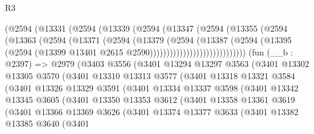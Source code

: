 \begin{lexlean}{R3}
\begin{coremodule}
                      (@2594
                        (@13331
                          (@2594
                            (@13339
                              (@2594
                                (@13347
                                  (@2594
                                    (@13355
                                      (@2594
                                        (@13363
                                          (@2594
                                            (@13371
                                              (@2594
                                                (@13379
                                                  (@2594
                                                    (@13387
                                                      (@2594
                                                        (@13395
                                                          (@2594
                                                            (@13399
                                                              @13401
                                                              @2615
                                                              @2590)))))))))))))))))))))))))))))
    (fun (__b : @2397) =>
    @2979
      (@3403
        @3556
        (@3401
          @13294
          @13297
          @3563
          (@3401
            @13302
            @13305
            @3570
            (@3401
              @13310
              @13313
              @3577
              (@3401
                @13318
                @13321
                @3584
                (@3401
                  @13326
                  @13329
                  @3591
                  (@3401
                    @13334
                    @13337
                    @3598
                    (@3401
                      @13342
                      @13345
                      @3605
                      (@3401
                        @13350
                        @13353
                        @3612
                        (@3401
                          @13358
                          @13361
                          @3619
                          (@3401
                            @13366
                            @13369
                            @3626
                            (@3401
                              @13374
                              @13377
                              @3633
                              (@3401
                                @13382
                                @13385
                                @3640
                                (@3401

\end{coremodule}
\end{lexlean}
